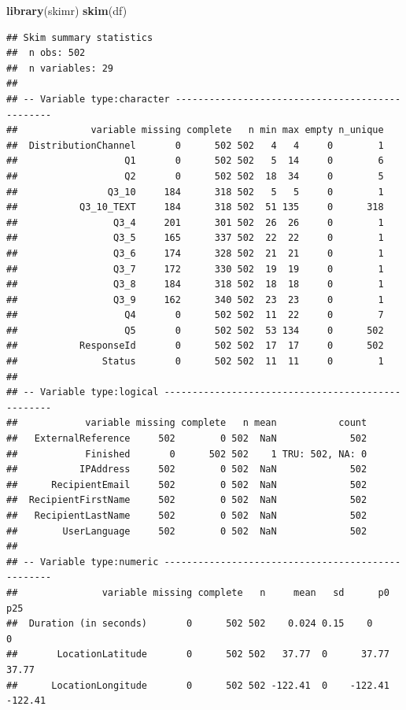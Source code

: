 \documentclass[]{book}
\newenvironment{Shaded}{\begin{snugshade}}{\end{snugshade}}
\newcommand{\KeywordTok}[1]{\textcolor[rgb]{0.13,0.29,0.53}{\textbf{#1}}}
\newcommand{\NormalTok}[1]{#1}
\begin{document}
\begin{Shaded}
\begin{Highlighting}[]
\KeywordTok{library}\NormalTok{(skimr)}
\KeywordTok{skim}\NormalTok{(df)}
\end{Highlighting}
\end{Shaded}

\begin{verbatim}
## Skim summary statistics
##  n obs: 502 
##  n variables: 29 
## 
## -- Variable type:character ------------------------------------------------
##             variable missing complete   n min max empty n_unique
##  DistributionChannel       0      502 502   4   4     0        1
##                   Q1       0      502 502   5  14     0        6
##                   Q2       0      502 502  18  34     0        5
##                Q3_10     184      318 502   5   5     0        1
##           Q3_10_TEXT     184      318 502  51 135     0      318
##                 Q3_4     201      301 502  26  26     0        1
##                 Q3_5     165      337 502  22  22     0        1
##                 Q3_6     174      328 502  21  21     0        1
##                 Q3_7     172      330 502  19  19     0        1
##                 Q3_8     184      318 502  18  18     0        1
##                 Q3_9     162      340 502  23  23     0        1
##                   Q4       0      502 502  11  22     0        7
##                   Q5       0      502 502  53 134     0      502
##           ResponseId       0      502 502  17  17     0      502
##               Status       0      502 502  11  11     0        1
## 
## -- Variable type:logical --------------------------------------------------
##            variable missing complete   n mean           count
##   ExternalReference     502        0 502  NaN             502
##            Finished       0      502 502    1 TRU: 502, NA: 0
##           IPAddress     502        0 502  NaN             502
##      RecipientEmail     502        0 502  NaN             502
##  RecipientFirstName     502        0 502  NaN             502
##   RecipientLastName     502        0 502  NaN             502
##        UserLanguage     502        0 502  NaN             502
## 
## -- Variable type:numeric --------------------------------------------------
##               variable missing complete   n     mean   sd      p0     p25
##  Duration (in seconds)       0      502 502    0.024 0.15    0       0   
##       LocationLatitude       0      502 502   37.77  0      37.77   37.77
##      LocationLongitude       0      502 502 -122.41  0    -122.41 -122.41

\end{verbatim}
\end{document}
